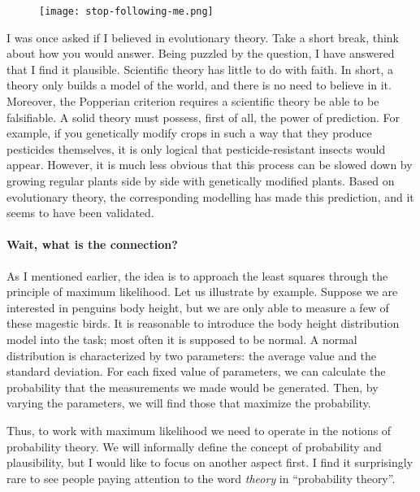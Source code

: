 \documentclass[notitlepage,oneside]{book}
\begin{document}
\begin{figure}
\texttt{[image: stop-following-me.png]}
\end{figure}
I was once asked if I believed in evolutionary theory. 
Take a short break, think about how you would answer.
Being puzzled by the question, I have answered that I find it plausible. 
Scientific theory has little to do with faith.
In short, a theory only builds a model of the world, and there is no need to believe in it.
Moreover, the Popperian criterion\cite{} requires a scientific theory be able to be falsifiable. 
A solid theory must possess, first of all, the power of prediction.
For example, if you genetically modify crops in such a way that they produce pesticides themselves, 
it is only logical that pesticide-resistant insects would appear. 
However, it is much less obvious that this process can be slowed down by growing regular plants side by side with genetically modified plants. 
Based on evolutionary theory, the corresponding modelling has made this prediction\cite{}, and it seems to have been validated\cite{}.

\paragraph*{Wait, what is the connection?}

As I mentioned earlier, the idea is to approach the least squares through the principle of maximum likelihood. 
Let us illustrate by example. 
Suppose we are interested in penguins body height, but we are only able to measure a few of these magestic birds.
It is reasonable to introduce the body height distribution model into the task; most often it is supposed to be normal.
A normal distribution is characterized by two parameters: the average value and the standard deviation.
For each fixed value of parameters, we can calculate the probability that the measurements we made would be generated.
Then, by varying the parameters, we will find those that maximize the probability.

Thus, to work with maximum likelihood we need to operate in the notions of probability theory.
We will informally define the concept of probability and plausibility,
but I would like to focus on another aspect first.
I find it surprisingly rare to see people paying attention to the word \textit{theory} in ``probability theory''.
\end{document}
